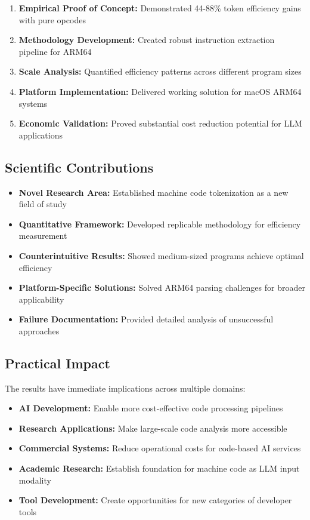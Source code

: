 \documentclass[11pt,a4paper]{article}
\begin{document}
\begin{enumerate}
    \item \textbf{Empirical Proof of Concept:} Demonstrated 44-88\% token efficiency gains with pure opcodes
    \item \textbf{Methodology Development:} Created robust instruction extraction pipeline for ARM64
    \item \textbf{Scale Analysis:} Quantified efficiency patterns across different program sizes
    \item \textbf{Platform Implementation:} Delivered working solution for macOS ARM64 systems
    \item \textbf{Economic Validation:} Proved substantial cost reduction potential for LLM applications
\end{enumerate}

\subsection{Scientific Contributions}
\begin{itemize}
    \item \textbf{Novel Research Area:} Established machine code tokenization as a new field of study
    \item \textbf{Quantitative Framework:} Developed replicable methodology for efficiency measurement
    \item \textbf{Counterintuitive Results:} Showed medium-sized programs achieve optimal efficiency
    \item \textbf{Platform-Specific Solutions:} Solved ARM64 parsing challenges for broader applicability
    \item \textbf{Failure Documentation:} Provided detailed analysis of unsuccessful approaches
\end{itemize}

\subsection{Practical Impact}
The results have immediate implications across multiple domains:
\begin{itemize}
    \item \textbf{AI Development:} Enable more cost-effective code processing pipelines
    \item \textbf{Research Applications:} Make large-scale code analysis more accessible
    \item \textbf{Commercial Systems:} Reduce operational costs for code-based AI services
    \item \textbf{Academic Research:} Establish foundation for machine code as LLM input modality
    \item \textbf{Tool Development:} Create opportunities for new categories of developer tools
\end{itemize}
\end{document}
